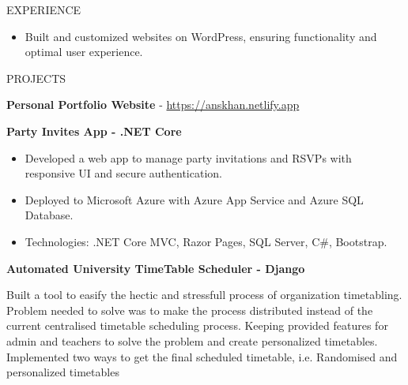 \documentclass{resume} %
\begin{document}
\begin{rSection}{EXPERIENCE}
\begin{itemize}
		\item Built and customized websites on WordPress, ensuring functionality and optimal user experience. \\
		
	\end{itemize}
	
	
	

  
\begin{rSection}{PROJECTS}
\vspace{-1.25em}
\item \textbf{Personal Portfolio Website}  - \href{https://anskhan.netlify.app}{https://anskhan.netlify.app}

\item \textbf{Party Invites App - .NET Core}
\begin{itemize}
	\item Developed a web app to manage party invitations and RSVPs with responsive UI and secure authentication.
	\item Deployed to Microsoft Azure with Azure App Service and Azure SQL Database.
	\item Technologies: .NET Core MVC, Razor Pages, SQL Server, C\#, Bootstrap.
\end{itemize}

\iffalse
\item \textbf{Automated University TimeTable Scheduler - Django}





 {Built a tool to easify the hectic and stressfull process of organization timetabling. Problem needed to solve was to make the process distributed instead of the current centralised timetable scheduling process. Keeping provided features for admin and teachers to solve the problem and create personalized timetables. Implemented two ways to get the final scheduled timetable, i.e. Randomised and personalized timetables}


\end{rSection}
\end{rSection}
\end{document}

